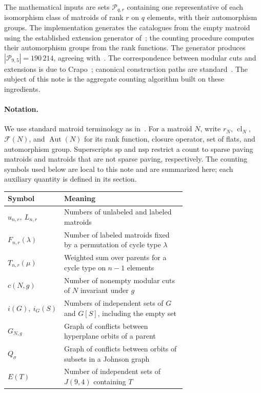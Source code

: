 \documentclass[11pt]{article}
\theoremstyle{definition}
\newcounter{algorithm}
\DeclareMathOperator{\Aut}{Aut}
\DeclareMathOperator{\cl}{cl}
\newcommand{\SP}{\mathrm{sp}}
\newcommand{\nsp}{\mathrm{nsp}}
\newcommand{\Part}{\mathcal P}
\newcommand{\Fl}{\mathcal F}
\begin{document}
The mathematical inputs are sets $\Part_{q,r}$ containing one representative
of each isomorphism class of matroids of rank $r$ on $q$ elements, with their
automorphism groups. The implementation generates the catalogues from the empty matroid using the
established extension generator of~\cite{MMIB,IC}; the counting procedure computes
their automorphism groups from the rank functions. The generator produces
$|\Part_{9,5}|=190\,214$, agreeing with~\cite{MR}.
The correspondence between modular cuts and extensions is due to
Crapo~\cite{Crapo}; canonical construction paths are standard~\cite{McKay}.
The subject of this note is
the aggregate counting algorithm built on these ingredients.

\paragraph{Notation.}
We use standard matroid terminology as in~\cite{Oxley,MR}. For a matroid
$N$, write $r_N$, $\cl_N$, $\Fl(N)$, and $\Aut(N)$ for its rank function,
closure operator, set of flats, and automorphism group. Superscripts
$\SP$ and $\nsp$ restrict a count to sparse paving matroids and matroids
that are not sparse paving, respectively. The counting symbols used below
are local to this note and are summarized here; each auxiliary quantity is
defined in its section.
\begin{center}
\small
\begin{tabular}{@{}lp{0.69\linewidth}@{}}
\toprule
Symbol & Meaning\\
\midrule
$u_{n,r},\ L_{n,r}$ & Numbers of unlabeled and labeled matroids\\
$F_{n,r}(\lambda)$ & Number of labeled matroids fixed by a permutation
of cycle type $\lambda$\\
$T_{n,r}(\mu)$ & Weighted sum over parents for a cycle type on $n-1$ elements\\
$c(N,g)$ & Number of nonempty modular cuts of $N$ invariant under $g$\\
$i(G),\ i_G(S)$ & Numbers of independent sets of $G$ and $G[S]$,
including the empty set\\
$G_{N,g}$ & Graph of conflicts between hyperplane orbits of a parent\\
$Q_\sigma$ & Graph of conflicts between orbits of subsets in a Johnson graph\\
$E(T)$ & Number of independent sets of $J(9,4)$ containing $T$\\
\bottomrule
\end{tabular}
\end{center}
\end{document}
